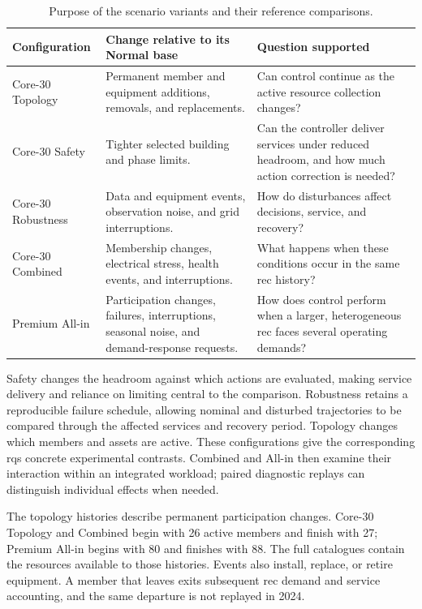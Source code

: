 \begin{table}[!htbp]
\centering\small
\caption{Purpose of the scenario variants and their reference comparisons.}
\label{tab:sim-scenario-purpose}
\begin{tabularx}{\textwidth}{@{}p{}p{}X@{}}
\toprule
\textbf{Configuration} & \textbf{Change relative to its Normal base} & \textbf{Question supported}\\
\midrule
Core-30 Topology & Permanent member and equipment additions, removals, and replacements. & Can control continue as the active resource collection changes?\\
Core-30 Safety & Tighter selected building and phase limits. & Can the controller deliver services under reduced headroom, and how much action correction is needed?\\
Core-30 Robustness & Data and equipment events, observation noise, and grid interruptions. & How do disturbances affect decisions, service, and recovery?\\
Core-30 Combined & Membership changes, electrical stress, health events, and interruptions. & What happens when these conditions occur in the same \gls{rec} history?\\
Premium All-in & Participation changes, failures, interruptions, seasonal noise, and demand-response requests. & How does control perform when a larger, heterogeneous \gls{rec} faces several operating demands?\\
\bottomrule
\end{tabularx}
\end{table}

Safety changes the headroom against which actions are evaluated, making service delivery and reliance on limiting central to the comparison. Robustness retains a reproducible failure schedule, allowing nominal and disturbed trajectories to be compared through the affected services and recovery period. Topology changes which members and assets are active. These configurations give the corresponding \glspl{rq} concrete experimental contrasts. Combined and All-in then examine their interaction within an integrated workload; paired diagnostic replays can distinguish individual effects when needed.

The topology histories describe permanent participation changes. Core-30 Topology and Combined begin with 26 active members and finish with 27; Premium All-in begins with 80 and finishes with 88. The full catalogues contain the resources available to those histories. Events also install, replace, or retire equipment. A member that leaves exits subsequent \gls{rec} demand and service accounting, and the same departure is not replayed in 2024.

